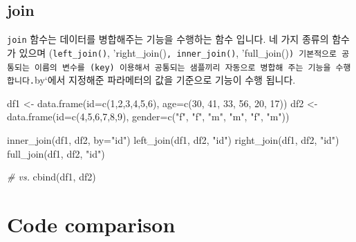 \documentclass[
]{book}
\newenvironment{Shaded}{\begin{snugshade}}{\end{snugshade}}
\newcommand{\AttributeTok}[1]{\textcolor[rgb]{0.77,0.63,0.00}{#1}}
\newcommand{\CommentTok}[1]{\textcolor[rgb]{0.56,0.35,0.01}{\textit{#1}}}
\newcommand{\DecValTok}[1]{\textcolor[rgb]{0.00,0.00,0.81}{#1}}
\newcommand{\FunctionTok}[1]{\textcolor[rgb]{0.00,0.00,0.00}{#1}}
\newcommand{\NormalTok}[1]{#1}
\newcommand{\OtherTok}[1]{\textcolor[rgb]{0.56,0.35,0.01}{#1}}
\newcommand{\StringTok}[1]{\textcolor[rgb]{0.31,0.60,0.02}{#1}}
\begin{document}
\hypertarget{join}{%
\subsection{join}\label{join}}

\texttt{join} 함수는 데이터를 병합해주는 기능을 수행하는 함수 입니다. 네 가지 종류의 함수가 있으며 (\texttt{left\_join()}, 'right\_join()\texttt{,\ \textquotesingle{}inner\_join()}, 'full\_join()\texttt{)\ 기본적으로\ 공통되는\ 이름의\ 변수를\ (key)\ 이용해서\ 공통되는\ 샘플끼리\ 자동으로\ 병합해\ 주는\ 기능을\ 수행합니다.}by`에서 지정해준 파라메터의 값을 기준으로 기능이 수행 됩니다.

\begin{Shaded}
\begin{Highlighting}[]
\NormalTok{df1 }\OtherTok{\textless{}{-}} \FunctionTok{data.frame}\NormalTok{(}\AttributeTok{id=}\FunctionTok{c}\NormalTok{(}\DecValTok{1}\NormalTok{,}\DecValTok{2}\NormalTok{,}\DecValTok{3}\NormalTok{,}\DecValTok{4}\NormalTok{,}\DecValTok{5}\NormalTok{,}\DecValTok{6}\NormalTok{), }\AttributeTok{age=}\FunctionTok{c}\NormalTok{(}\DecValTok{30}\NormalTok{, }\DecValTok{41}\NormalTok{, }\DecValTok{33}\NormalTok{, }\DecValTok{56}\NormalTok{, }\DecValTok{20}\NormalTok{, }\DecValTok{17}\NormalTok{))}
\NormalTok{df2 }\OtherTok{\textless{}{-}} \FunctionTok{data.frame}\NormalTok{(}\AttributeTok{id=}\FunctionTok{c}\NormalTok{(}\DecValTok{4}\NormalTok{,}\DecValTok{5}\NormalTok{,}\DecValTok{6}\NormalTok{,}\DecValTok{7}\NormalTok{,}\DecValTok{8}\NormalTok{,}\DecValTok{9}\NormalTok{), }\AttributeTok{gender=}\FunctionTok{c}\NormalTok{(}\StringTok{"f"}\NormalTok{, }\StringTok{"f"}\NormalTok{, }\StringTok{"m"}\NormalTok{, }\StringTok{"m"}\NormalTok{, }\StringTok{"f"}\NormalTok{, }\StringTok{"m"}\NormalTok{))}

\FunctionTok{inner\_join}\NormalTok{(df1, df2, }\AttributeTok{by=}\StringTok{"id"}\NormalTok{)}
\FunctionTok{left\_join}\NormalTok{(df1, df2, }\StringTok{"id"}\NormalTok{)}
\FunctionTok{right\_join}\NormalTok{(df1, df2, }\StringTok{"id"}\NormalTok{)}
\FunctionTok{full\_join}\NormalTok{(df1, df2, }\StringTok{"id"}\NormalTok{)}

\CommentTok{\# vs.}
\FunctionTok{cbind}\NormalTok{(df1, df2)}
\end{Highlighting}
\end{Shaded}

\hypertarget{code-comparison}{%
\section{Code comparison}\label{code-comparison}}
\end{document}
